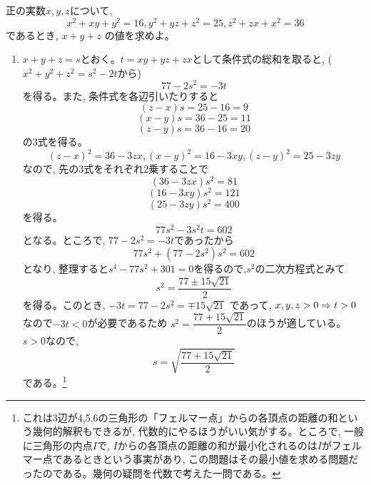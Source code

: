 正の実数$x,y,z$について, 
\[x^2+xy+y^2=16,　y^2+yz+z^2=25,　z^2+zx+x^2=36\]
であるとき, $x+y+z$ の値を求めよ。
\enthm
\begin{enumerate}
\item[] $x+y+z=s$とおく。$t=xy+yz+zx$として条件式の総和を取ると, ($x^2+y^2+z^2=s^2-2t$から)
\[77-2s^2=-3t\]
を得る。また, 条件式を各辺引いたりすると
\[(z-x)s=25-16=9\]
\[(x-y)s=36-25=11\]
\[(z-y)s=36-16=20\]
の3式を得る。
\[(z-x)^2=36-3zx,　(x-y)^2=16-3xy,　(z-y)^2=25-3zy\]
なので, 先の3式をそれぞれ2乗することで
\[(36-3zx)s^2=81\]
\[(16-3xy)s^2=121\]
\[(25-3zy)s^2=400\]
を得る。
\[77s^2-3s^2t=602\]
となる。ところで, $77-2s^2=-3t$であったから
\[77s^2+(77-2s^2)s^2=602\]
となり, 整理すると$s^4-77s^2+301=0$を得るので,$s^2$の二次方程式とみて
\[s^2=\dfrac{77\pm 15\sqrt{21}}{2}\]
を得る。このとき, $-3t=77-2s^2=\mp 15\sqrt{21}$ であって, $x,y,z>0\Rightarrow t>0$なので$-3t<0$が必要であるため $s^2=\dfrac{77+15\sqrt{21}}{2}$のほうが適している。$s>0$なので, 
\[s=\sqrt{\dfrac{77+15\sqrt{21}}{2}}\]
である。\footnote{これは3辺が4,5,6の三角形の「フェルマー点」からの各頂点の距離の和という幾何的解釈もできるが, 代数的にやるほうがいい気がする。ところで, 一般に三角形の内点$I$で, $I$からの各頂点の距離の和が最小化されるのは$I$がフェルマー点であるときという事実があり, この問題はその最小値を求める問題だったのである。幾何の疑問を代数で考えた一問である。}
\end{enumerate}
